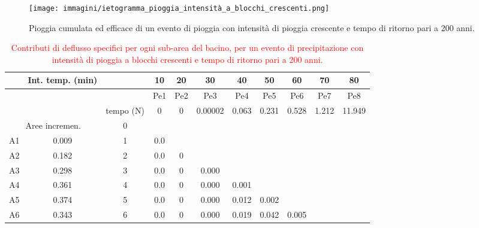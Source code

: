 \begin{figure}[H]  \centering
        \texttt{[image: immagini/ietogramma\_pioggia\_intensità\_a\_blocchi\_crescenti.png]}
        \caption{Pioggia cumulata ed efficace di un evento di pioggia con intensità di pioggia crescente e tempo di ritorno pari a 200 anni.}
        \label{ietogramma_pioggia_intensità_a_blocchi_crescenti}
\end{figure}

\begin{table}[H] \centering
    \caption{\textcolor{red}{Contributi di deflusso specifici per ogni sub-area del bacino, per un evento di precipitazione con intensità di pioggia a blocchi crescenti e tempo di ritorno pari a 200 anni.}}
    \begin{tabular}{ccccccccccc}
    \toprule
    & Int. temp. (min) &  & 10  & 20  & 30      & 40                & 50                & 60                & 70               & 80     \\
\midrule
 & & & Pe1 & Pe2 & Pe3     & Pe4 & Pe5   & Pe6 & Pe7   & Pe8    \\
    &    & tempo (N) & 0   & 0   & 0.00002 & 0.063 & 0.231 & 0.528 & 1.212 & 11.949 \\
    \multicolumn{2}{c}{Aree incremen.}  & 0         &     &     &         &                   &                   &                   &                  &        \\
    A1        & 0.009                      & 1         & 0.0 &     &         &                   &                   &                   &                  &        \\
    A2        & 0.182                      & 2         & 0.0 & 0   &         &                   &                   &                   &                  &        \\
    A3        & 0.298                      & 3         & 0.0 & 0   & 0.000   &                   &                   &                   &                  &        \\
    A4        & 0.361                      & 4         & 0.0 & 0   & 0.000   & 0.001             &                   &                   &                  &        \\
    A5        & 0.374                      & 5         & 0.0 & 0   & 0.000   & 0.012             & 0.002             &                   &                  &        \\
    A6        & 0.343                      & 6         & 0.0 & 0   & 0.000   & 0.019             & 0.042             & 0.005             &                  &        \\

\end{tabular}
\end{table}
